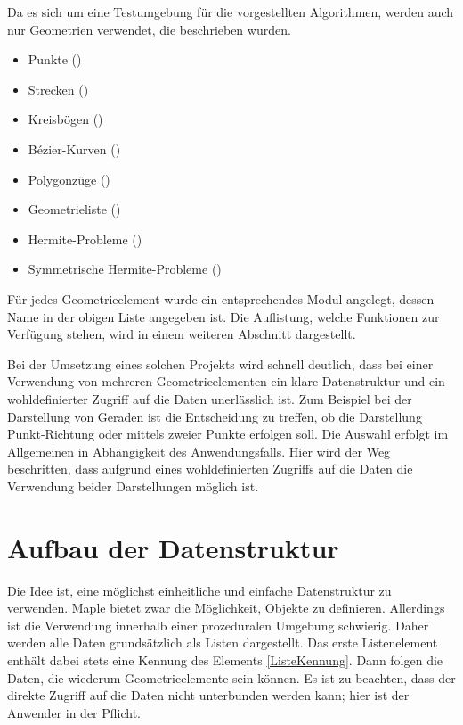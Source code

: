 Da es sich um eine Testumgebung für die vorgestellten Algorithmen, werden auch nur Geometrien verwendet, die beschrieben wurden.

\begin{itemize}
	\item Punkte ()
	\item Strecken ()
	\item Kreisbögen ()
  \item Bézier-Kurven ()
	\item Polygonzüge ()
	\item Geometrieliste ()
	\item Hermite-Probleme ()
	\item Symmetrische Hermite-Probleme ()
\end{itemize}

Für jedes Geometrieelement wurde ein entsprechendes Modul angelegt, dessen Name in der obigen Liste angegeben ist. Die Auflistung, welche Funktionen zur Verfügung stehen, wird in einem weiteren  Abschnitt dargestellt.

Bei der Umsetzung eines solchen Projekts wird schnell deutlich, dass bei einer Verwendung von mehreren Geometrieelementen ein klare Datenstruktur und ein wohldefinierter Zugriff auf die Daten unerlässlich ist. Zum Beispiel bei der Darstellung von Geraden ist die Entscheidung zu treffen, ob die Darstellung Punkt-Richtung oder mittels zweier Punkte erfolgen soll. Die Auswahl erfolgt im Allgemeinen in Abhängigkeit des Anwendungsfalls. Hier wird der Weg beschritten, dass aufgrund eines wohldefinierten Zugriffs auf die Daten die Verwendung beider Darstellungen möglich ist.

\section{Aufbau der Datenstruktur}

Die Idee ist, eine möglichst einheitliche und einfache Datenstruktur zu verwenden. Maple bietet zwar die Möglichkeit, Objekte zu definieren. Allerdings ist die Verwendung innerhalb einer prozeduralen Umgebung schwierig. Daher werden alle Daten grundsätzlich als Listen dargestellt. Das erste Listenelement enthält dabei stets eine Kennung des Elements \ref{ListeKennung}. Dann folgen die Daten, die wiederum Geometrieelemente sein können. Es ist zu beachten, dass der direkte Zugriff auf die Daten nicht unterbunden werden kann; hier ist der Anwender in der Pflicht.

